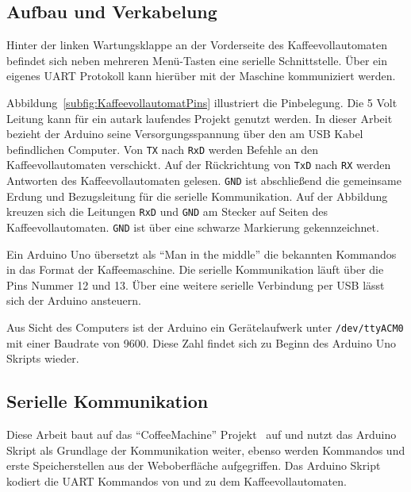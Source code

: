\subsection{Aufbau und Verkabelung}
Hinter der linken Wartungsklappe an der Vorderseite des Kaffeevollautomaten befindet sich neben mehreren Menü-Tasten eine serielle Schnittstelle.
Über ein eigenes \ac{UART} Protokoll kann hierüber mit der Maschine kommuniziert werden.

Abbildung~\ref{subfig:KaffeevollautomatPins} illustriert die Pinbelegung.
Die 5 Volt Leitung kann für ein autark laufendes Projekt genutzt werden.
In dieser Arbeit bezieht der Arduino seine Versorgungsspannung über den am USB Kabel befindlichen Computer.
Von \texttt{TX} nach \texttt{RxD} werden Befehle an den Kaffeevollautomaten verschickt.
Auf der Rückrichtung von \texttt{TxD} nach \texttt{RX} werden Antworten des Kaffeevollautomaten gelesen.
\texttt{GND} ist abschließend die gemeinsame Erdung und Bezugsleitung für die serielle Kommunikation.
Auf der Abbildung kreuzen sich die Leitungen \texttt{RxD} und \texttt{GND} am Stecker auf Seiten des Kaffeevollautomaten.
\texttt{GND} ist über eine schwarze Markierung gekennzeichnet.

Ein Arduino Uno übersetzt als "`Man in the middle"' die bekannten Kommandos in das Format der Kaffeemaschine.
Die serielle Kommunikation läuft über die Pins Nummer 12 und 13.
Über eine weitere serielle Verbindung per USB lässt sich der Arduino ansteuern.

Aus Sicht des Computers ist der Arduino ein Gerätelaufwerk unter \texttt{/dev/ttyACM0} mit einer Baudrate von 9600.
Diese Zahl findet sich zu Beginn des Arduino Uno Skripts wieder.


\subsection{Serielle Kommunikation}
Diese Arbeit baut auf das "`CoffeeMachine"' Projekt~\cite{GitCoffeeMachine} auf und nutzt das Arduino Skript als Grundlage der Kommunikation weiter, ebenso werden Kommandos und erste Speicherstellen aus der Weboberfläche aufgegriffen.
Das Arduino Skript kodiert die \ac{UART} Kommandos von und zu dem Kaffeevollautomaten.

